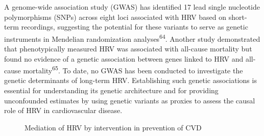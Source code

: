 \documentclass[
  a4paper,
  headsepline=true,
  open=any]{scrbook}
\begin{document}
A genome-wide association study (GWAS) has identified 17 lead single
nucleotide polymorphisms (SNPs) across eight loci associated with HRV
based on short-term recordings, suggesting the potential for these
variants to serve as genetic instruments in Mendelian randomization
analyses\textsuperscript{64}. Another study demonstrated that
phenotypically measured HRV was associated with all-cause mortality but
found no evidence of a genetic association between genes linked to HRV
and all-cause mortality\textsuperscript{65}. To date, no GWAS has been
conducted to investigate the genetic determinants of long-term HRV.
Establishing such genetic associations is essential for understanding
its genetic architecture and for providing unconfounded estimates by
using genetic variants as proxies to assess the causal role of HRV in
cardiovascular disease.

\begin{figure}

\begin{minipage}[t]{\linewidth}

{\centering 


\caption{Mediation of HRV by intervention in prevention of CVD}

}

\end{minipage}%

\end{figure}
\end{document}
